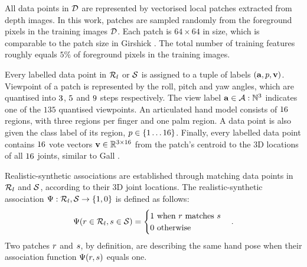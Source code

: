 All data points in $\mathcal{D}$ are represented by vectorised local patches extracted from depth images. In this work, patches are sampled randomly from the foreground pixels in the training images $\mathcal{D}$. Each patch is $64 \times 64$ in size, which is comparable to the patch size in Girshick \etal \cite{Girshick2011}. The total number of training features roughly equals $5\%$ of foreground pixels in the training images. 

Every labelled data point in $\mathcal{R}_{l}$ or $\mathcal{S}$ is assigned to a tuple of labels $(\mathbf{a}, p, \mathbf{v})$. 
Viewpoint of a patch is represented by the roll, pitch and yaw angles, which are quantised into $3$, $5$ and $9$ steps respectively. The view label $\mathbf{a} \in \mathcal{A}:\mathbb{N}^{3}$ indicates one of the $135$ quantised viewpoints.
An articulated hand model consists of $16$ regions, with three regions per finger and one palm region. A data point is also given the class label of its region, $p \in \{1\dots16\}$.   
Finally, every labelled data point contains $16$ vote vectors $\mathbf{v} \in \mathbb{R}^{3\times16}$ from the patch's centroid to the 3D locations of all $16$ joints, similar to Gall \etal \cite{Gall2011}. 

Realistic-synthetic associations are established through matching data points in $\mathcal{R}_{l}$ and $\mathcal{S}$, according to their 3D joint locations.  The realistic-synthetic association $\mathrm{\Psi}: \mathcal{R}_{l},\mathcal{S} \rightarrow \{1,0\}$ is defined as follows:
\begin{equation}
	\mathrm{\Psi}(r \in \mathcal{R}_{l}, s \in \mathcal{S}) =
		\begin{cases}
			1 \mbox{ when $r$ matches $s$} \\
			0 \mbox{ otherwise}
		\end{cases}.
	\label{eq:association}
\end{equation}
Two patches $r$ and $s$, by definition, are describing the same hand pose when their association function $\mathrm{\Psi}(r, s)$ equals one.  

